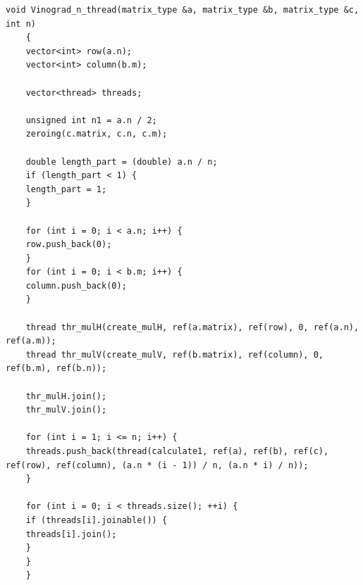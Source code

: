 \documentclass[12pt, a4paper]{report}
\begin{document}
	\begin{lstlisting}[label=code1,caption=Реализация алгоритма Винограда]
	void Vinograd_n_thread(matrix_type &a, matrix_type &b, matrix_type &c, int n)
	{
	vector<int> row(a.n);
	vector<int> column(b.m);
	
	vector<thread> threads;
	
	unsigned int n1 = a.n / 2;
	zeroing(c.matrix, c.n, c.m);
	
	double length_part = (double) a.n / n;
	if (length_part < 1) {
	length_part = 1;
	}
	
	for (int i = 0; i < a.n; i++) {
	row.push_back(0);
	}
	for (int i = 0; i < b.m; i++) {
	column.push_back(0);
	}
	
	thread thr_mulH(create_mulH, ref(a.matrix), ref(row), 0, ref(a.n), ref(a.m));
	thread thr_mulV(create_mulV, ref(b.matrix), ref(column), 0, ref(b.m), ref(b.n));
	
	thr_mulH.join();
	thr_mulV.join();
	
	for (int i = 1; i <= n; i++) {
	threads.push_back(thread(calculate1, ref(a), ref(b), ref(c), ref(row), ref(column), (a.n * (i - 1)) / n, (a.n * i) / n));
	}
	
	for (int i = 0; i < threads.size(); ++i) {
	if (threads[i].joinable()) {
	threads[i].join();
	}
	}
	}
	
	\end{lstlisting}
\end{document}

